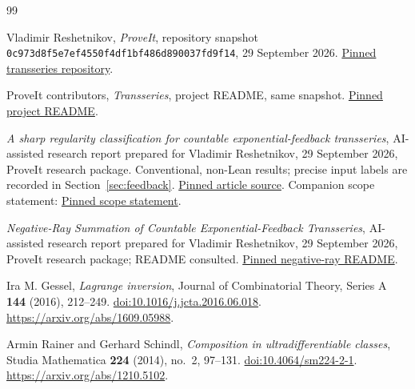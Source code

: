 \documentclass[11pt,a4paper]{article}
\numberwithin{equation}{section}
\theoremstyle{definition}
\theoremstyle{remark}
\newcommand{\commit}{\nolinkurl{0c973d8f5e7ef4550f4df1bf486d890037fd9f14}}
\begin{document}
\begin{thebibliography}{99}
\small
{}

Vladimir Reshetnikov, \emph{ProveIt}, repository snapshot
\commit, 29 September 2026.
\href{https://github.com/VladimirReshetnikov/ProveIt/tree/0c973d8f5e7ef4550f4df1bf486d890037fd9f14/Analysis/Transseries}{Pinned transseries repository}.

ProveIt contributors, \emph{Transseries}, project README, same snapshot.
\href{https://github.com/VladimirReshetnikov/ProveIt/blob/0c973d8f5e7ef4550f4df1bf486d890037fd9f14/Analysis/Transseries/README.md}{Pinned project README}.

\emph{A sharp regularity classification for countable exponential-feedback
transseries}, AI-assisted research report prepared for Vladimir Reshetnikov,
29 September 2026, ProveIt research package. Conventional, non-Lean
results; precise input labels are recorded in Section~\ref{sec:feedback}.
\href{https://github.com/VladimirReshetnikov/ProveIt/blob/0c973d8f5e7ef4550f4df1bf486d890037fd9f14/Analysis/Transseries/docs/series-and-transseries/Exponential_Feedback_Regularity_Classification/article.tex}{Pinned article source}.
Companion scope statement:
\href{https://github.com/VladimirReshetnikov/ProveIt/blob/0c973d8f5e7ef4550f4df1bf486d890037fd9f14/Analysis/Transseries/docs/series-and-transseries/Exponential_Feedback_Regularity_Classification/README.md}{Pinned scope statement}.

\emph{Negative-Ray Summation of Countable Exponential-Feedback
Transseries}, AI-assisted research report prepared for Vladimir Reshetnikov,
29 September 2026, ProveIt research package; README consulted.
\href{https://github.com/VladimirReshetnikov/ProveIt/blob/0c973d8f5e7ef4550f4df1bf486d890037fd9f14/Analysis/Transseries/docs/series-and-transseries/Negative_Ray_Summation_Exponential_Feedback/README.md}{Pinned negative-ray README}.

Ira M. Gessel, \emph{Lagrange inversion}, Journal of Combinatorial Theory,
Series A \textbf{144} (2016), 212--249.
\href{https://doi.org/10.1016/j.jcta.2016.06.018}{doi:10.1016/j.jcta.2016.06.018}.
\url{https://arxiv.org/abs/1609.05988}.

Armin Rainer and Gerhard Schindl, \emph{Composition in ultradifferentiable
classes}, Studia Mathematica \textbf{224} (2014), no.~2, 97--131.
\href{https://doi.org/10.4064/sm224-2-1}{doi:10.4064/sm224-2-1}.
\url{https://arxiv.org/abs/1210.5102}.


\end{thebibliography}
\end{document}
